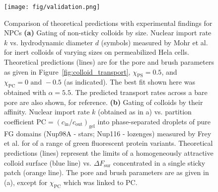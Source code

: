 \documentclass[12pt, a4paper]{article}
\begin{document}
\begin{figure}
    \centering
    \texttt{[image: fig/validation.png]}
    \caption{
    Comparison of theoretical predictions with experimental findings for NPCs
    \textbf{(a)} 
    Gating of non-sticky colloids by size.
    Nuclear import rate $k$ vs. hydrodynamic diameter $d$ (symbols) measured by Mohr et al. for inert colloids of varying sizes on permeabilized Hela cells.
    Theoretical predictions (lines) are for the pore and brush parameters as given in Figure~\ref{fig:colloid_transport}, $\chi_{\text{PS}} = 0.5$, and $\chi_{\text{PC}} = 0 \text{ and } -0.5$ (as indicated).
    The best fit shown here was obtained with $\alpha = 5.5$.
    The predicted transport rates across a bare pore are also shown, for reference.
    \textbf{(b)} 
    Gating of colloids by their affinity.
    Nuclear import rate $k$ (obtained as in a) vs. partition coefficient $\text{PC}=\left(c_{\text{in}}/c_{\text{out}}\right)_{\text{gel}}$ into phase-separated droplets of pure FG domains (Nup98A - stars; Nup116 - lozenges) measured by Frey et al. for of a range of green fluorescent protein variants.
    Theoretical predictions (lines) represent the limits of a homogeneously attractive colloid surface (blue line) vs. $\Delta F_\text{sur}$ concentrated in a single sticky patch (orange line).
    The pore and brush parameters are as given in (a), except for $\chi_\text{PC}$ which was linked to $\text{PC}$.
    }
    \label{fig:NPC_comparison}
\end{figure}
\end{document}

